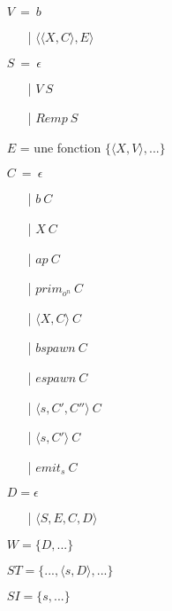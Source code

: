 \documentclass[10pt,a4paper]{article}
\begin{document}
					
				\begin{itemize}
					\item[] $V~=~b$
					\begin{itemize}
						\item[|] $\langle\langle X,C\rangle,E\rangle$
					\end{itemize}
					\item[] $S~=~\epsilon$ 
					\begin{itemize}
						\item[|] $V~S$ 
						\item[|] $Remp~S$
					\end{itemize}
					\item[] $E$ = une fonction $\{\langle X,V\rangle,...\}$
					\item[] $C~=~\epsilon$ 
					\begin{itemize}
						\item[|] $b~C$
						\item[|] $X~C$
						\item[|] $ap~C$
						\item[|] $prim_{o^{n}}~C$  
						\item[|] $\langle X,C\rangle~C$
						\item[|] $bspawn~C$ 
						\item[|] $espawn~C$
						\item[|] $\langle s,C',C''\rangle~C$
						\item[|] $\langle s,C'\rangle~C$ 
						\item[|] $emit_{s}~C$ 
					\end{itemize}
					\item[] $D = \epsilon$
					\begin{itemize}
						\item[|] $\langle S,E,C,D\rangle$ 
					\end{itemize}
					\item[] $W = \{D,...\}$
					\item[] $ST = \{...,\langle s,D\rangle,...\}$
					\item[] $SI = \{ s,...\}$
				\end{itemize}
				\bigbreak
				\bigbreak
					
\end{document}
